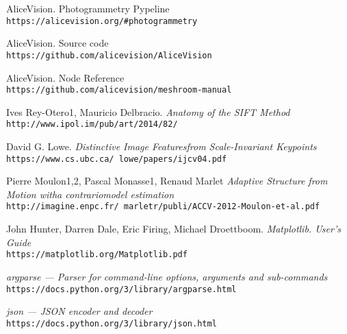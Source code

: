 
\begin{thebibliography}{9}
AliceVision. Photogrammetry Pypeline
\\\texttt{https://alicevision.org/\#photogrammetry}

AliceVision. Source code
\\\texttt{https://github.com/alicevision/AliceVision}

AliceVision. Node Reference
\\\texttt{https://github.com/alicevision/meshroom-manual}

Ives Rey-Otero1, Mauricio Delbracio.
\textit{Anatomy of the SIFT Method}
\\\texttt{http://www.ipol.im/pub/art/2014/82/}

David G. Lowe.
\textit{Distinctive Image Featuresfrom Scale-Invariant Keypoints}
\\\texttt{https://www.cs.ubc.ca/~lowe/papers/ijcv04.pdf}

Pierre Moulon1,2, Pascal Monasse1, Renaud Marlet
\textit{Adaptive Structure from Motion witha contrariomodel estimation}
\\\texttt{http://imagine.enpc.fr/~marletr/publi/ACCV-2012-Moulon-et-al.pdf}

John Hunter, Darren Dale, Eric Firing, Michael Droettboom.
\textit{Matplotlib. User’s Guide}
\\\texttt{https://matplotlib.org/Matplotlib.pdf}

\textit{argparse — Parser for command-line options, arguments and sub-commands}
\\\texttt{https://docs.python.org/3/library/argparse.html}

\textit{json — JSON encoder and decoder}
\\\texttt{https://docs.python.org/3/library/json.html}

\end{thebibliography}
